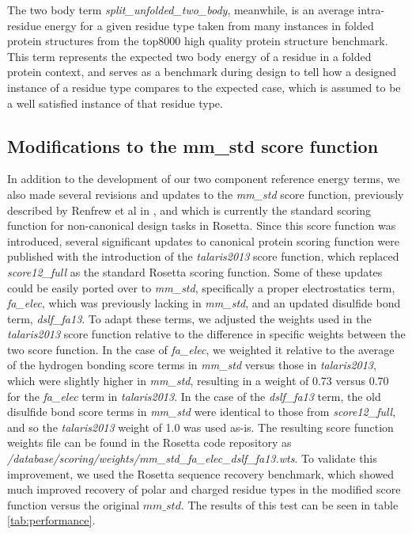 The two body term \textit{split\_unfolded\_two\_body}, meanwhile, is an average intra-residue energy for a given residue type taken from many instances in folded protein structures from the top8000 high quality protein structure benchmark\cite{lovell_structure_2003}.
This term represents the expected two body energy of a residue in a folded protein context, and serves as a benchmark during design to tell how a designed instance of a residue type compares to the expected case, which is assumed to be a well satisfied instance of that residue type.


\subsection{Modifications to the mm\_std score function}
In addition to the development of our two component reference energy terms, we also made several revisions and updates to the \textit{mm\_std} score function, previously described by Renfrew et al in \cite{renfrew_incorporation_2012}, and which is currently the standard scoring function for non-canonical design tasks in Rosetta.
Since this score function was introduced, several significant updates to canonical protein scoring function were published with the introduction of the \textit{talaris2013} score function, which replaced \textit{score12\_full} as the standard Rosetta scoring function\cite{leaver-fay_chapter_2013}.
Some of these updates could be easily ported over to \textit{mm\_std}, specifically a proper electrostatics term, \textit{fa\_elec}, which was previously lacking in \textit{mm\_std}, and an updated disulfide bond term, \textit{dslf\_fa13}.
To adapt these terms, we adjusted the weights used in the \textit{talaris2013} score function relative to the difference in specific weights between the two score function.
In the case of \textit{fa\_elec}, we weighted it relative to the average of the hydrogen bonding score terms in \textit{mm\_std} versus those in \textit{talaris2013}, which were slightly higher in \textit{mm\_std}, resulting in a weight of 0.73 versus 0.70 for the \textit{fa\_elec} term in \textit{talaris2013}.
In the case of the \textit{dslf\_fa13} term, the old disulfide bond score terms in \textit{mm\_std} were identical to those from \textit{score12\_full}, and so the \textit{talaris2013} weight of 1.0 was used as-is.
The resulting score function weights file can be found in the Rosetta code repository as \textit{/database/scoring/weights/mm\_std\_fa\_elec\_dslf\_fa13.wts}.
To validate this improvement, we used the Rosetta sequence recovery benchmark, which showed much improved recovery of polar and charged residue types in the modified score function versus the original $mm\_std$.
The results of this test can be seen in table \ref{tab:performance}.


